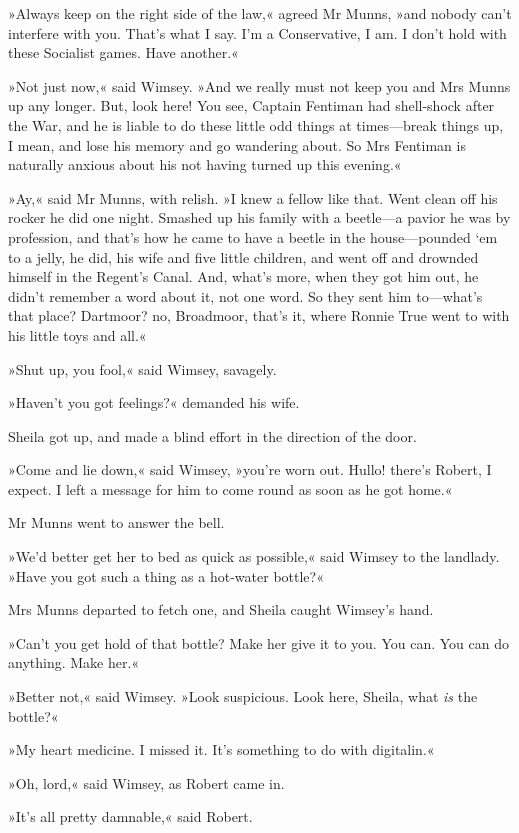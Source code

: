 »Always keep on the right side of the law,« agreed Mr Munns, »and nobody can't interfere with you. That's what I say. I'm a Conservative, I am. I don't hold with these Socialist games. Have another.«

»Not just now,« said Wimsey. »And we really must not keep you and Mrs Munns up any longer. But, look here! You see, Captain Fentiman had shell-shock after the War, and he is liable to do these little odd things at times—break things up, I mean, and lose his memory and go wandering about. So Mrs Fentiman is naturally anxious about his not having turned up this evening.«

»Ay,« said Mr Munns, with relish. »I knew a fellow like that. Went clean off his rocker he did one night. Smashed up his family with a beetle—a pavior he was by profession, and that's how he came to have a beetle in the house—pounded `em to a jelly, he did, his wife and five little children, and went off and drownded himself in the Regent's Canal. And, what's more, when they got him out, he didn't remember a word about it, not one word. So they sent him to—what's that place? Dartmoor? no, Broadmoor, that's it, where Ronnie True went to with his little toys and all.«

»Shut up, you fool,« said Wimsey, savagely.

»Haven't you got feelings?« demanded his wife.

Sheila got up, and made a blind effort in the direction of the door.

»Come and lie down,« said Wimsey, »you're worn out. Hullo! there's Robert, I expect. I left a message for him to come round as soon as he got home.«

Mr Munns went to answer the bell.

»We'd better get her to bed as quick as possible,« said Wimsey to the landlady. »Have you got such a thing as a hot-water bottle?«

Mrs Munns departed to fetch one, and Sheila caught Wimsey's hand.

»Can't you get hold of that bottle? Make her give it to you. You can. You can do anything. Make her.«

»Better not,« said Wimsey. »Look suspicious. Look here, Sheila, what \textit{is} the bottle?«

»My heart medicine. I missed it. It's something to do with digitalin.«

»Oh, lord,« said Wimsey, as Robert came in.

»It's all pretty damnable,« said Robert.

